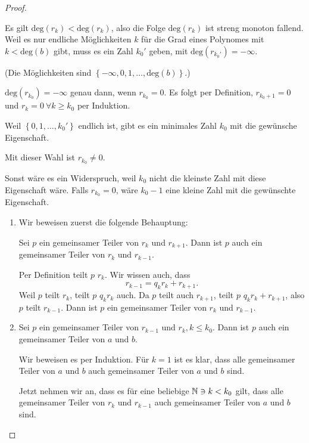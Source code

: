 \begin{proof}
	\begin{parts}
	\item \label{enum:linalg1blatt5-2}	Es gilt $\text{deg}(r_k)<\text{deg}(r_k)$, also die Folge $\text{deg}(r_k)$ ist streng monoton fallend. Weil es nur endliche Möglichkeiten $k$ f\"{u}r die Grad eines Polynomes mit $k<\text{deg}(b)$ gibt, muss es ein Zahl $k_0'$ geben, mit $\text{deg}(r_{k_0'})=-\infty$.
	
		(Die Möglichkeiten sind $\left\{ -\infty,0,1,\dots,\text{deg}(b) \right\} $.)

		$\text{deg}(r_{k_0})=-\infty$ genau dann, wenn $r_{k_0}=0$. Es folgt per Definition, $r_{k_0+1}=0$ und $r_{k}=0~\forall k\ge k_0$ per Induktion.

		Weil $\left\{ 0,1,\dots, k_0' \right\} $ endlich ist, gibt es ein minimales Zahl $k_0$ mit die gewünsche Eigenschaft.
\item 
	\begin{tcolorbox}
		Mit dieser Wahl ist $r_{k_0}\neq 0$.
	\end{tcolorbox}
	Sonst wäre es ein Widerspruch, weil $k_0$ nicht die kleinste Zahl mit diese Eigenschaft wäre. Falls $r_{k_0}=0$, wäre $k_0-1$ eine kleine Zahl mit die gewünschte Eigenschaft.

	\begin{enumerate}[label=(\roman*)]
		\item \label{enum:linalg1blatt5-1}Wir beweisen zuerst die folgende Behauptung:
	\begin{tcolorbox}
		Sei $p$ ein gemeinsamer Teiler von $r_{k}$ und $r_{k+1}$. Dann ist $p$ auch ein gemeinsamer Teiler von $r_k$ und $r_{k-1}$.
	\end{tcolorbox}
	Per Definition teilt $p$ $r_k$. Wir wissen auch, dass
	\[
		r_{k-1}=q_kr_k+r_{k+1}
	.\]
	Weil $p$ teilt $r_k$, teilt $p$ $q_kr_k$ auch. Da $p$ teilt auch $r_{k+1}$, teilt $p$ $q_kr_k+r_{k+1}$, also $p$ teilt $r_{k-1}$. Dann ist $p$ ein gemeinsamer Teiler von $r_k$ und $r_{k-1}$.
\item Sei $p$ ein gemeinsamer Teiler von $r_{k-1}$ und $r_{k},k\le k_0$. Dann ist $p$ auch ein gemeinsamer Teiler von $a$ und $b$.

	Wir beweisen es per Induktion. F\"{u}r $k=1$ ist es klar, dass alle gemeinsamer Teiler von $a$ und $b$ auch gemeinsamer Teiler von $a$ und $b$ sind. 

	Jetzt nehmen wir an, dass es f\"{u}r eine beliebige $\mathbb{N}\ni k<k_0$ gilt, dass alle gemeinsamer Teiler von $r_k$ und $r_{k-1}$ auch gemeinsamer Teiler von $a$ und $b$ sind.


\end{enumerate}
\end{parts}
\end{proof}
